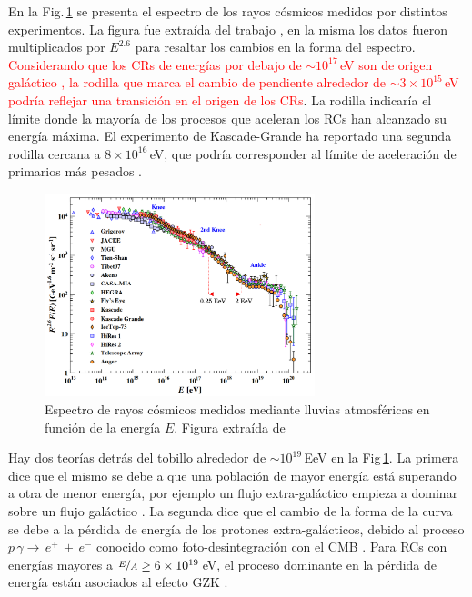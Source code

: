En la Fig.\,\ref{fig:spectra} se presenta el espectro de los rayos cósmicos medidos por distintos experimentos. La figura fue extraída del trabajo \cite{PGD}, en la misma los datos fueron multiplicados por $E^{2.6}$ para resaltar los cambios en la forma del espectro. \textcolor{red}{Considerando que los CRs de energías por debajo de $\sim  10^{17}\,$eV son de origen galáctico \cite{taborda}, la rodilla que marca el cambio de pendiente alrededor de $\sim 3\times10^{15}\,$eV podría reflejar una transición en el origen de los CRs}. La rodilla indicaría el límite donde la mayoría de los procesos que aceleran los RCs han alcanzado su energía máxima. El experimento de Kascade-Grande ha reportado una segunda rodilla cercana a $8\times10^{16}\,$eV, que podría corresponder al límite de aceleración de primarios más pesados \cite{PGD}.

\begin{figure}[H]
	\centering
	\includegraphics[width=0.7\textwidth]{auger_spectrum_v2.png}
	\caption{Espectro de rayos cósmicos medidos mediante lluvias atmosféricas en función de la energía $E$. Figura extraída de \cite{PGD}}
	\label{fig:spectra}
\end{figure}

Hay dos teorías detrás del tobillo alrededor de $\sim 10^{19}\,$EeV en la Fig\,\ref{fig:spectra}. La primera dice que el mismo se debe a que una población de mayor energía está superando a otra de menor energía, por ejemplo un flujo extra-galáctico empieza a dominar sobre un flujo galáctico \cite{bird1994cosmic}. La segunda dice que el cambio de la forma de la curva se debe a la pérdida de energía de los protones extra-galácticos, debido al proceso $p\,\gamma \rightarrow\,e^+\,+\,e^-$ conocido como foto-desintegración con el CMB \cite{berezinsky2006astrophysical}. Para RCs con energías  mayores  a $\nicefrac{E}{A} \geq 6\times 10^{19}\,$eV, el proceso dominante en la pérdida de energía están asociados al efecto GZK \cite{taborda}.

